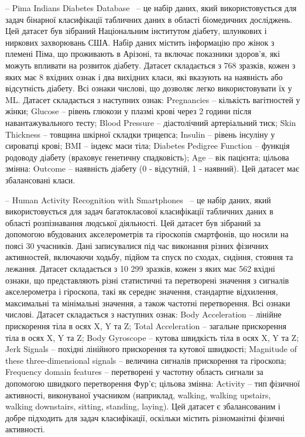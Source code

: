 -- Pima Indians Diabetes Database~\cite{ct30} -- це набір даних, який використовується для задач бінарної класифікації табличних даних в області біомедичних досліджень. Цей датасет був зібраний Національним інститутом діабету, шлункових і ниркових захворювань США. Набір даних містить інформацію про жінок з племені Піма, що проживають в Арізоні, та включає показники здоров'я, які можуть впливати на розвиток діабету. Датасет складається з 768 зразків, кожен з яких має 8 вхідних ознак і два вихідних класи, які вказують на наявність або відсутність діабету. Всі ознаки числові, що дозволяє легко використовувати їх у ML. Датасет складається з наступних ознак: Pregnancies -- кількість вагітностей у жінки; Glucose -- рівень глюкози у плазмі крові через 2 години після навантажувального тесту; Blood Pressure -- діастолічний артеріальний тиск; Skin Thickness -- товщина шкірної складки трицепса; Insulin -- рівень інсуліну у сироватці крові; BMI -- індекс маси тіла; Diabetes Pedigree Function -- функція родоводу діабету (враховує генетичну спадковість); Age -- вік пацієнта; цільова змінна: Outcome -- наявність діабету (0 - відсутній, 1 - наявний). Цей датасет має збалансовані класи.

-- Human Activity Recognition with Smartphones~\cite{ct31} -- це набір даних, який використовується для задач багатокласової класифікації табличних даних в області розпізнавання людської діяльності. Цей датасет був зібраний за допомогою вбудованих акселерометрів та гіроскопів смартфонів, що носили на поясі 30 учасників. Дані записувалися під час виконання різних фізичних активностей, включаючи ходьбу, підйом та спуск по сходах, сидіння, стояння та лежання. Датасет складається з 10 299 зразків, кожен з яких має 562 вхідні ознаки, що представляють різні статистичні та перетворені значення з сигналів акселерометра і гіроскопа, такі як середнє значення, стандартне відхилення, максимальні та мінімальні значення, а також частотні перетворення. Всі ознаки числові. Датасет складається з наступних ознак: Body Acceleration -- лінійне прискорення тіла в осях X, Y та Z; Total Acceleration -- загальне прискорення тіла в осях X, Y та Z; Body Gyroscope -- кутова швидкість тіла в осях X, Y та Z; Jerk Signals -- похідні лінійного прискорення та кутової швидкості; Magnitude of these three-dimensional signals -- величина сигналів прискорення та гіроскопа; Frequency domain features -- перетворені у частотну область сигнали за допомогою швидкого перетворення Фур'є; цільова змінна: Activity -- тип фізичної активності, виконуваної учасником (наприклад, walking, walking upstairs, walking downstairs, sitting, standing, laying). Цей датасет є збалансованим і добре підходить для задач класифікації, оскільки містить різноманітні фізичні активності.

